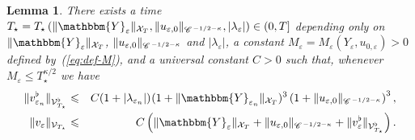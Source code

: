 \documentclass[a4paper,11pt]{article}
\newtheorem{lemma}[theorem]{Lemma}
{\theorembodyfont{\rmfamily}\newtheorem{remark}[theorem]{Remark}}
\newcommand{\CC}{\mathscr{C} \hspace{.1em}}
\begin{document}
\begin{lemma}
  \label{l:apriori-bounds}There exists a time $T_{\star} = T_{\star} \left( \|
  \mathbbm{Y}_{\varepsilon} \|_{\mathcal{X}_T}, \| u_{\varepsilon, 0}
  \|_{\CC^{- 1 / 2 - \kappa}}, | \lambda_{\varepsilon} | \right) \in (0, T]$
  depending only on $\| \mathbbm{Y}_{\varepsilon} \|_{\mathcal{X}_T}$, $\|
  u_{\varepsilon, 0} \|_{\CC^{- 1 / 2 - \kappa}}$ and $| \lambda_{\varepsilon}
  |$, a constant $M_{\varepsilon} = M_{\varepsilon} (Y_{\varepsilon}, u_{0,
  \varepsilon}) > 0$ defined by~(\ref{eq:def-M}), and a universal constant $C
  > 0$ such that, whenever $M_{\varepsilon} \leqslant T_{\star}^{\kappa / 2}$
  we have
  \begin{eqnarray*}
    \| v^{\flat}_{\varepsilon_n} \|_{\mathcal{V}_{T_{\star}}^{\flat}} &
    \leqslant & C (1 + | \lambda_{\varepsilon_n} |)_{}  (1 + \|
    \mathbbm{Y}_{\varepsilon_n} \|_{\mathcal{X}_T})^3 \left( 1 + \|
    u_{\varepsilon, 0} \|_{\CC^{- 1 / 2 - \kappa}} \right)^3,\\
    \| v_{\varepsilon} \|_{\mathcal{V}_{T_{\star}}} & \leqslant & C \left( \|
    \mathbbm{Y}_{\varepsilon} \|_{\mathcal{X}_T} + \| u_{\varepsilon, 0}
    \|_{\CC^{- 1 / 2 - \kappa}} + \| v^{\flat}_{\varepsilon}
    \|_{\mathcal{V}_{T_{\star}}^{\flat}} \right) .
  \end{eqnarray*}
\end{lemma}
\end{document}

